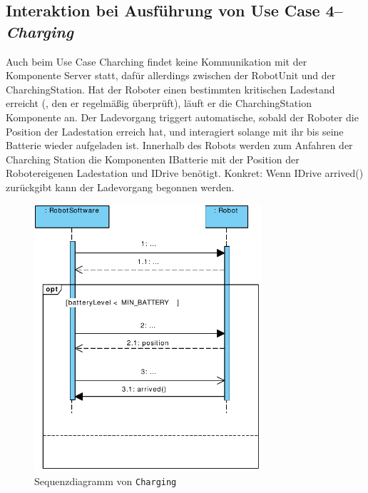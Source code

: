 	
	
	\subsection*{Interaktion bei Ausführung von Use Case 4– \emph{Charging}}
	Auch beim Use Case Charching findet keine Kommunikation mit der Komponente Server statt, dafür allerdings zwischen der RobotUnit und der CharchingStation. Hat der Roboter einen bestimmten kritischen Ladestand erreicht (, den er regelmäßig überprüft), läuft er die CharchingStation Komponente an. Der Ladevorgang triggert automatische, sobald der Roboter die Position der Ladestation erreich hat, und interagiert solange mit ihr bis seine Batterie wieder aufgeladen ist. Innerhalb des Robots werden zum Anfahren der Charching Station die Komponenten IBatterie mit der Position der Robotereigenen Ladestation und IDrive benötigt. Konkret: Wenn IDrive arrived() zurückgibt kann der Ladevorgang begonnen werden.

	
	\begin{figure}[H]
		\centering
		\includegraphics[width=0.75\textwidth]{img/0-Entwurf-8-Charging}
		\caption{Sequenzdiagramm von \texttt{Charging}}
		\label{Charging}
	\end{figure}
